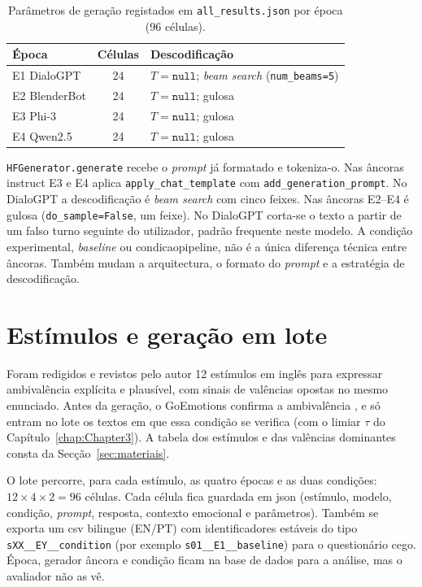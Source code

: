 \begin{table}[ht]
\centering
\caption[Parâmetros de geração por época.]{Parâmetros de geração registados em \texttt{all\_results.json} por época (96 células).}
\label{tab:gen_params}
\begin{tabular}{lcp{6.8cm}}
\hline
Época & Células & Descodificação \\
\hline
E1 DialoGPT & 24 & \(T=\texttt{null}\); \textit{beam search} (\texttt{num\_beams=5}) \\
E2 BlenderBot & 24 & \(T=\texttt{null}\); gulosa \\
E3 Phi-3 & 24 & \(T=\texttt{null}\); gulosa \\
E4 Qwen2.5 & 24 & \(T=\texttt{null}\); gulosa \\
\hline
\end{tabular}
\end{table}

\texttt{HFGenerator.generate} recebe o \textit{prompt} já formatado e tokeniza-o. Nas âncoras instruct E3 e E4 aplica \texttt{apply\_chat\_template} com \texttt{add\_generation\_prompt}. No DialoGPT a descodificação é \textit{beam search} com cinco feixes. Nas âncoras E2--E4 é gulosa (\texttt{do\_sample=False}, um feixe). No DialoGPT corta-se o texto a partir de um falso turno seguinte do utilizador, padrão frequente neste modelo. A condição experimental, \textit{baseline} ou \gls{condicaopipeline}, não é a única diferença técnica entre âncoras. Também mudam a arquitectura, o formato do \textit{prompt} e a estratégia de descodificação.


\section{Estímulos e geração em lote}
\label{sec:impl_batch}

Foram redigidos e revistos pelo autor 12 estímulos em inglês para expressar ambivalência explícita e plausível, com sinais de valências opostas no mesmo enunciado. Antes da geração, o GoEmotions confirma a ambivalência \parencite{Demszky2020GoEmotions}, e só entram no lote os textos em que essa condição se verifica (com o limiar \(\tau\) do Capítulo~\ref{chap:Chapter3}). A tabela dos estímulos e das valências dominantes consta da Secção~\ref{sec:materiais}.

O lote percorre, para cada estímulo, as quatro épocas e as duas condições: \(12 \times 4 \times 2 = 96\) células. Cada célula fica guardada em \gls{json} (estímulo, modelo, condição, \textit{prompt}, resposta, contexto emocional e parâmetros). Também se exporta um \gls{csv} bilingue (EN/PT) com identificadores estáveis do tipo \texttt{sXX\_\_EY\_\_condition} (por exemplo \texttt{s01\_\_E1\_\_baseline}) para o questionário cego. Época, gerador âncora e condição ficam na base de dados para a análise, mas o avaliador não as vê.

